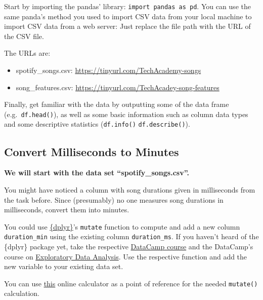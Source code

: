 \documentclass[
  11pt,
]{book}
\providecommand{\tightlist}{%
  \setlength{\itemsep}{0pt}\setlength{\parskip}{0pt}}
\newenvironment{tips}[1]
  {
  \begin{itemize}
  \footnotesize
  \renewcommand{\labelitemi}{
    \raisebox{-.7\height}[0pt][0pt]{
      {\setkeys{Gin}{width=3em,keepaspectratio}
        \texttt{[image: images/\#1.png]}}
    }
  }
  \setlength{\fboxsep}{1em}
  \begin{rbox}
  \item
  }
  {
  \end{rbox}
  \end{itemize}
  }
\newenvironment{tipsp}[1]
  {
  \begin{itemize}
  \footnotesize
  \renewcommand{\labelitemi}{
    \raisebox{-.7\height}[0pt][0pt]{
      {\setkeys{Gin}{width=3em,keepaspectratio}
        \texttt{[image: images/\#1.png]}}
    }
  }
  \setlength{\fboxsep}{1em}
  \begin{pbox}
  \item
  }
  {
  \end{pbox}
  \end{itemize}
  }
\begin{document}
\begin{tipsp}p

Start by importing the pandas' library: \texttt{import\ pandas\ as\ pd}.
You can use the same panda's method you used to import CSV data from your local machine to import CSV data from a web server: Just replace the file path with the URL of the CSV file.

The URLs are:

\begin{itemize}
\tightlist
\item
  spotify\_songs.csv: \url{https://tinyurl.com/TechAcademy-songs}
\item
  song\_features.csv: \url{https://tinyurl.com/TechAcadey-song-features}
\end{itemize}

Finally, get familiar with the data by outputting some of the data frame (e.g.~\texttt{df.head()}), as well as some basic information such as column data types and some descriptive statistics (\texttt{df.info()} \texttt{df.describe()}).

\end{tipsp}

\hypertarget{convert-milliseconds-to-minutes}{%
\subsection{Convert Milliseconds to Minutes}\label{convert-milliseconds-to-minutes}}

\textbf{We will start with the data set ``spotify\_songs.csv''.}

You might have noticed a column with song durations given in milliseconds from the task before. Since (presumably) no one measures song durations in milliseconds, convert them into minutes.

\begin{tips}r

You could use \href{https://dplyr.tidyverse.org/index.html}{\{dplyr\}}'s \texttt{mutate} function to compute and add a new column \texttt{duration\_min} using the existing column \texttt{duration\_ms}. If you haven't heard of the \{dplyr\} package yet, take the respective \href{https://www.datacamp.com/courses/data-manipulation-with-dplyr}{DataCamp course} and the DataCamp's course on \href{https://www.datacamp.com/courses/exploratory-data-analysis}{Exploratory Data Analysis}. Use the respective function and add the new variable to your existing data set.

You can use \href{https://www.timecalculator.net/milliseconds-to-minutes}{this} online calculator as a point of reference for the needed \texttt{mutate()} calculation.

\end{tips}
\end{document}
